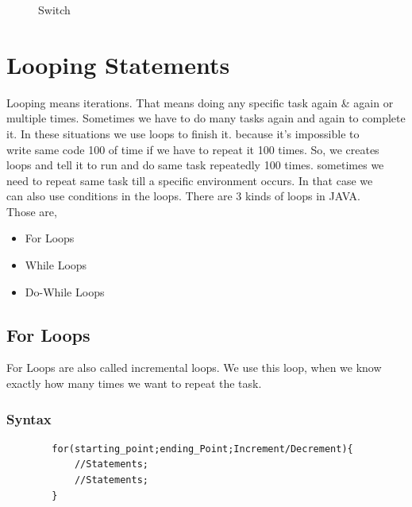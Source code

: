 \documentclass[openany]{book}  %
\begin{document}
% 
% 
\begin{figure}[htbp]
    \begin{center}
        \caption{Switch\cite{Ref3}}
    \end{center}
\end{figure}

\newpage

% 
% 
\section{Looping Statements}
Looping means iterations. That means doing any specific task again \& again or \\
multiple times. Sometimes we have to do many tasks again and again to complete \\
it. In these situations we use loops to finish it. because it's impossible to \\
write same code 100 of time if we have to repeat it 100 times. So, we creates \\
loops and tell it to run and do same task repeatedly 100 times. sometimes we \\
need to repeat same task till a specific environment occurs. In that case we \\
can also use conditions in the loops. There are 3 kinds of loops in JAVA. \\
Those are,
\begin{itemize}
    \item For Loops
    \item While Loops
    \item Do-While Loops
\end{itemize}
% 
% 
\subsection{For Loops}
For Loops are also called incremental loops. We use this loop, when we know \\
exactly how many times we want to repeat the task.
% 
% 
\subsubsection{Syntax}
\begin{center}
    \begin{verbatim}
        for(starting_point;ending_Point;Increment/Decrement){
            //Statements;
            //Statements;
        }
    \end{verbatim}
\end{center}
% 
% 
\end{document}
